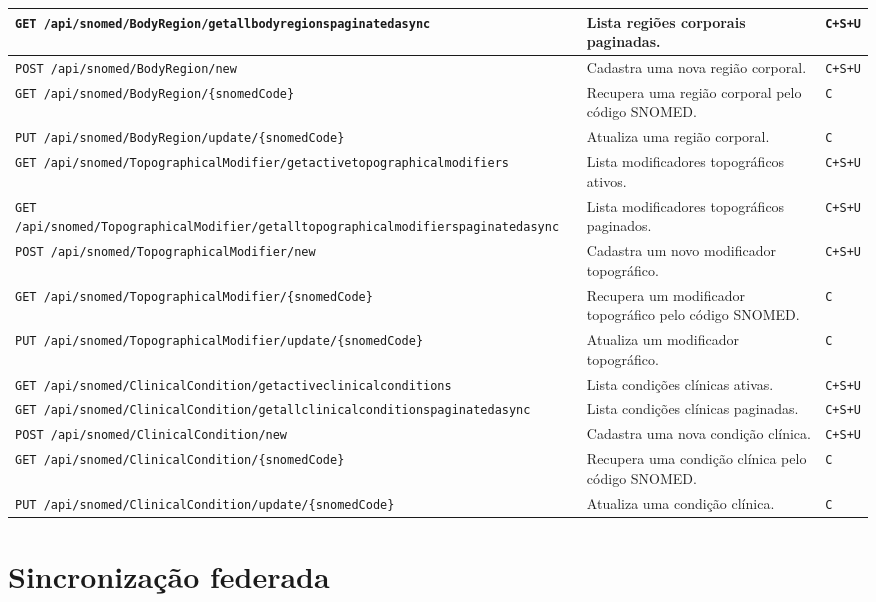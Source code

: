 \begin{longtable}{|p{}|p{}|p{}|}
\texttt{GET /api/snomed/BodyRegion/getallbodyregionspaginatedasync} & Lista regiões corporais paginadas. & \texttt{C+S+U} \\ \hline
\texttt{POST /api/snomed/BodyRegion/new} & Cadastra uma nova região corporal. & \texttt{C+S+U} \\ \hline
\texttt{GET /api/snomed/BodyRegion/\{snomedCode\}} & Recupera uma região corporal pelo código SNOMED. & \texttt{C} \\ \hline
\texttt{PUT /api/snomed/BodyRegion/update/\{snomedCode\}} & Atualiza uma região corporal. & \texttt{C} \\ \hline
\texttt{GET /api/snomed/TopographicalModifier/getactivetopographicalmodifiers} & Lista modificadores topográficos ativos. & \texttt{C+S+U} \\ \hline
\texttt{GET /api/snomed/TopographicalModifier/getalltopographicalmodifierspaginatedasync} & Lista modificadores topográficos paginados. & \texttt{C+S+U} \\ \hline
\texttt{POST /api/snomed/TopographicalModifier/new} & Cadastra um novo modificador topográfico. & \texttt{C+S+U} \\ \hline
\texttt{GET /api/snomed/TopographicalModifier/\{snomedCode\}} & Recupera um modificador topográfico pelo código SNOMED. & \texttt{C} \\ \hline
\texttt{PUT /api/snomed/TopographicalModifier/update/\{snomedCode\}} & Atualiza um modificador topográfico. & \texttt{C} \\ \hline
\texttt{GET /api/snomed/ClinicalCondition/getactiveclinicalconditions} & Lista condições clínicas ativas. & \texttt{C+S+U} \\ \hline
\texttt{GET /api/snomed/ClinicalCondition/getallclinicalconditionspaginatedasync} & Lista condições clínicas paginadas. & \texttt{C+S+U} \\ \hline
\texttt{POST /api/snomed/ClinicalCondition/new} & Cadastra uma nova condição clínica. & \texttt{C+S+U} \\ \hline
\texttt{GET /api/snomed/ClinicalCondition/\{snomedCode\}} & Recupera uma condição clínica pelo código SNOMED. & \texttt{C} \\ \hline
\texttt{PUT /api/snomed/ClinicalCondition/update/\{snomedCode\}} & Atualiza uma condição clínica. & \texttt{C} \\ \hline
\end{longtable}

\section{Sincronização federada}\label{sec:apendiceaSincronizacao}

